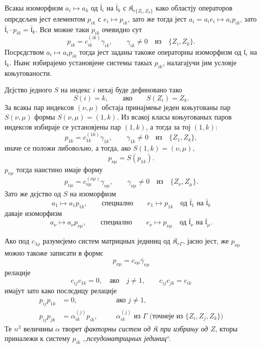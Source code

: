 \documentclass[11pt]{article}
\begin{document}
Всакы изоморфизм \(a_i\mapsto a_k\) од \(\bar{\mathfrak l}_i\) на \(\bar{\mathfrak l}_k\) с \(\mathfrak K_{r\{Z_i,Z_k\}}\) како областју операторов опрєдєљен јест елементом \(p_{ik}\) с \(e_i\mapsto p_{ik}\), зато же тогда јест \(a_i=a_ie_i\mapsto a_ip_{ik}\), зато \(\bar{\mathfrak l}_i\cdot p_{ik}=\bar{\mathfrak l}_k\). Вси можне таки \(p_{ik}\) очевидно сут
\[
p_{ik}=c_{ik}^{(ik)}\gamma_{ik},\qquad \gamma_{ik}\ne0\quad\text{из}\quad \{Z_i,Z_k\}.
\]
Посрєдством \(a_i\mapsto a_ip_{ik}\) тогда јест заданы такоже операторны изоморфизм од \(\mathfrak l_i\) на \(\mathfrak l_k\). Нынє избирајемо установјене системы такых \(p_{ik}\), налагајучи јим условје коњугованости.

Дєјство једного \(S\) на индекс \(i\) нехај буде дефиновано тако
\[
S(i)=k,\qquad\text{ако}\qquad S(Z_i)=Z_k.
\]
За всакы пар индексов \((\nu,\mu)\) обстаја принајмење једен коњугованы пар \(S(\nu,\mu)\) формы \(S(\nu,\mu)=(1,k)\). Из всакој класы коњугованых паров индексов избираје се установјены пар \((1,k)\), а тогда за тој \((1,k)\):
\[
p_{1k}=c_{1k}^{(1k)}\gamma_{1k},\qquad \gamma_{1k}\ne0\quad\text{из}\quad \{Z_1,Z_k\},
\]
иначе се положи либовољно, а тогда, ако \(S(1,k)=(\nu,\mu)\),
\[
p_{\nu\mu}=S(p_{1k}).
\]
\(p_{\nu\mu}\) тогда наистино имаје форму
\[
p_{\nu\mu}=c_{\nu\mu}^{(\nu\mu)}\gamma_{\nu\mu},\qquad
\gamma_{\nu\mu}\ne0\quad\text{из}\quad \{Z_\nu,Z_\mu\}.
\]
Зато же дєјство од \(S\) на изоморфизм
\[
a_1\mapsto a_1p_{1k},\qquad\text{специално}\qquad e_1\mapsto p_{1k}
\quad\text{од }\bar{\mathfrak l}_1\text{ на }\bar{\mathfrak l}_k
\]
даваје изоморфизм
\[
a_\nu\mapsto a_\nu p_{\nu\mu},\qquad\text{специално}\qquad e_\nu\mapsto p_{\nu\mu}
\quad\text{од }\bar{\mathfrak l}_\nu\text{ на }\bar{\mathfrak l}_\mu.
\]

Ако под \(c_{\lambda\rho}\) разумєјемо систем матрицных јединиц од \(\mathfrak K_{r\Gamma}\), јасно јест, же \(p_{\nu\mu}\) можно такоже записати в формє
\[
p_{\nu\mu}=c_{\nu\mu}\bar\gamma_{\nu\mu}
\]
релације
\[
c_{ij}c_{1k}=0,\quad\text{ако}\quad j\ne1,
\qquad
c_{ij}c_{jk}=c_{ik}
\]
имајут зато како послєдицу релације
\[
\begin{aligned}
p_{ij}p_{1k}&=0,\quad &&\text{ако }j\ne1,\\
p_{ij}p_{jk}&=\alpha_{ik}^{(j)}p_{ik},\quad
&&\alpha_{ik}^{(j)}\text{ из }\Gamma\text{ (точнеје из }\{Z_i,Z_j,Z_k\}\text{)}
\end{aligned}
\]
Те \(n^3\) величины \(\alpha\) творет \emph{факторны систем од \(\mathfrak K\) при избрању од \(Z\)}, кторы приналежи к систему \(p_{ik}\) ,,\emph{псеудоматрицных јединиц}``.
\end{document}
